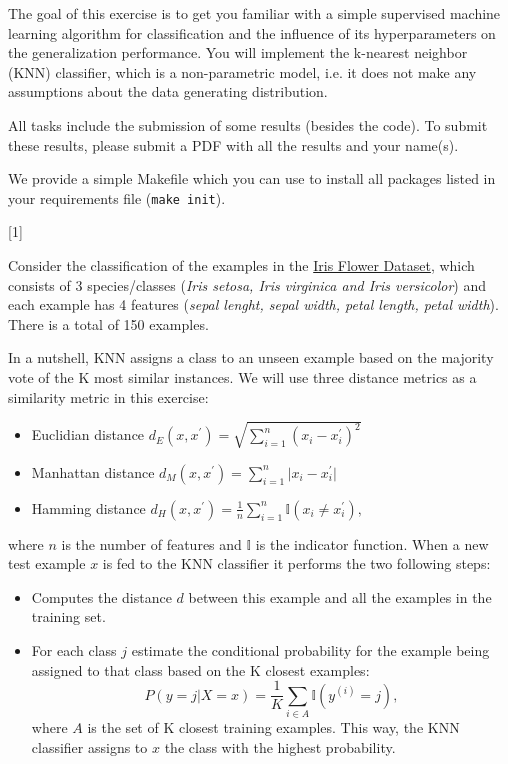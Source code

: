 \documentclass{exam}
\begin{document}
	\gccs
	The goal of this exercise is to get you familiar with a simple supervised machine learning algorithm for classification and the influence of its hyperparameters on the generalization performance. You will implement the k-nearest neighbor (KNN) classifier, which is a non-parametric model, i.e. it does not make any assumptions about the data generating distribution.
	
	\bigskip
	
	\noindent All tasks include the submission of some results (besides the code).
	To submit these results, please submit a PDF with all the results and your name(s).
	
	\noindent We provide a simple Makefile which you can use to install all packages listed in your requirements file (\texttt{make init}).
	
	
	\begin{questions}
		
		
		[1]
		
		Consider the classification of the examples in the \href{https://archive.ics.uci.edu/ml/datasets/Iris}{Iris Flower Dataset}, which consists of 3 species/classes (\textit{Iris setosa, Iris virginica and Iris versicolor}) and each example has 4 features (\textit{sepal lenght, sepal width, petal length, petal width}). There is a total of 150 examples.

		In a nutshell, KNN assigns a class to an unseen example based on the majority vote of the K most similar instances. We will use three distance metrics as a similarity metric in this exercise: 
		\begin{itemize}
			\item Euclidian distance $d_E(x, x^{\prime}) = \sqrt{\sum_{i=1}^n{(x_i - x_i^{\prime})^2}}$
			\item Manhattan distance $d_M(x, x^{\prime}) = \sum_{i=1}^n{\lvert x_i - x_i^{\prime} \rvert}$
			\item Hamming distance $d_H(x, x^{\prime}) = \frac{1}{n}\sum_{i=1}^n{\mathbb{I}(x_i \neq x_i^{\prime})},$
		\end{itemize}
		 where $n$ is the number of features and $\mathbb{I}$ is the indicator function. When a new test example $x$ is fed to the KNN classifier it performs the two following steps:
		
		\begin{itemize}
			\item Computes the distance $d$ between this example and all the examples in the training set.
			\item For each class $j$ estimate the conditional probability for the example being assigned to that class based on the K closest examples: $$P(y=j|X=x) = \frac{1}{K}\sum_{i\in A}\mathbb{I}(y^{(i)}=j),$$where $A$ is the set of K closest training examples. This way, the KNN classifier assigns to $x$ the class with the highest probability.


\end{itemize}
\end{questions}
\end{document}
